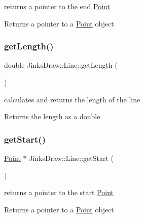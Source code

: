 returns a pointer to the end \mbox{\hyperlink{class_jinks_draw_1_1_point}{Point}} 

\begin{DoxyReturn}{Returns}
a pointer to a \mbox{\hyperlink{class_jinks_draw_1_1_point}{Point}} object 
\end{DoxyReturn}
\mbox{\label{class_jinks_draw_1_1_line_aeb77107e932c68b88be7e32344db1de4}} 
\subsubsection{\texorpdfstring{get\+Length()}{getLength()}}
{\footnotesize\ttfamily double Jinks\+Draw\+::\+Line\+::get\+Length (\begin{DoxyParamCaption}{ }\end{DoxyParamCaption})}



calculates and returns the length of the line 

\begin{DoxyReturn}{Returns}
the length as a double 
\end{DoxyReturn}
\mbox{\label{class_jinks_draw_1_1_line_a0457130d0cee09aa589c387cd7ed4b59}} 
\subsubsection{\texorpdfstring{get\+Start()}{getStart()}}
{\footnotesize\ttfamily \mbox{\hyperlink{class_jinks_draw_1_1_point}{Point}} $\ast$ Jinks\+Draw\+::\+Line\+::get\+Start (\begin{DoxyParamCaption}{ }\end{DoxyParamCaption})}



returns a pointer to the start \mbox{\hyperlink{class_jinks_draw_1_1_point}{Point}} 

\begin{DoxyReturn}{Returns}
a pointer to a \mbox{\hyperlink{class_jinks_draw_1_1_point}{Point}} object 
\end{DoxyReturn}
\mbox{\label{class_jinks_draw_1_1_line_a0cfaefbf55c982b045562e34c576ce81}} 
